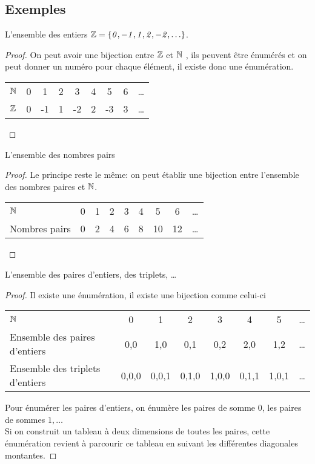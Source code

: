 \subsection{Exemples}
\label{subsec:exemples}

\begin{myexem}
  L'ensemble des entiers $\mathit{\mathbb{Z}=\{0,-1,1,2,-2,\ldots\}}$.
  \begin{proof}
     On peut avoir une bijection entre $\mathbb{Z}$ et $\mathbb{N}$ , ils peuvent être énumérés et on peut donner un numéro pour chaque élément, il existe donc une énumération. 
  
  \begin{tabular}{ l | c c c c c c c r }
     $\mathbb{N}$ & 0 & 1 & 2  & 3 & 4 & 5 & 6 & \ldots \\
     $\mathbb{Z}$ & 0 & -1 & 1 & -2 & 2 & -3 & 3  & \ldots \\
    
    \end{tabular}
  \end{proof}
\end{myexem}
  
\begin{myexem}
 L'ensemble des nombres pairs
  \begin{proof}
  Le principe reste le même: on peut établir une bijection entre l'ensemble des nombres paires et $\mathbb{N}$.
 
   \begin{tabular}{ l c c c c c c c r }
    $\mathbb{N}$ & 0 & 1 & 2  & 3 & 4 & 5 & 6 & \ldots \\
      Nombres pairs & 0 & 2 & 4 & 6 & 8 & 10 & 12  & \ldots \\
    \end{tabular}
  \end{proof} 
\end{myexem}
  
\begin{myexem}
  L'ensemble des paires d'entiers, des triplets, \ldots
    \begin{proof}
        Il existe une énumération, il existe une bijection comme celui-ci  
      
		\begin{tabular}{ l c c  c  c c c  r }
			$\mathbb{N}$  & 0 & 1 & 2  & 3 & 4 & 5 & \ldots  \\
			Ensemble des paires d'entiers & {0,0} & {1,0} & {0,1} & {0,2} & {2,0} & {1,2}  & \ldots \\
			Ensemble des triplets d'entiers & {0,0,0} & {0,0,1} & {0,1,0} & {1,0,0} & {0,1,1} & {1,0,1}  & \ldots \\
			
		\end{tabular}
	
	Pour énumérer les paires d'entiers, on énumère les paires de somme 0, les paires de sommes $1, \ldots$ \\
	Si on construit un tableau à deux dimensions de toutes les paires, cette énumération revient à parcourir ce tableau en suivant les différentes diagonales montantes.  
    \end{proof}   
\end{myexem}
  
